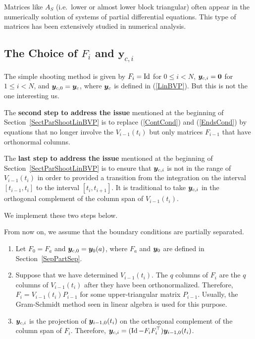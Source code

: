 \begin{rmkList}
\begin{enumerate}
Matrices like $A_S$ (i.e.\ lower or almost lower block triangular) often
appear in the numerically solution of systems of partial differential
equations.  This type of matrices has been extensively studied in
numerical analysis.  \label{ParShootPartSepRmkItem3}
\end{enumerate}
\end{rmkList}

\subsection{The Choice of $F_i$ and $\mathbf{y}_{c,i}$}\label{Fiyci}

The simple shooting method is given by $F_i = \operatorname{Id}$ for $0 \leq i < N$,
$\bm{y}_{c,i} = \bm{0}$ for $1 \leq i < N$, and
$\bm{y}_{c,0} = \bm{y}_c$, where $\bm{y}_c$ is defined in
(\ref{LinBVP}).  But this is not the one interesting us.

The {\bfseries second step to address the issue} mentioned at the
beginning of Section~\ref{SectParShootLinBVP} is to replace
(\ref{ContCond}) and (\ref{EndsCond}) by equations that no longer
involve the $V_{i-1}(t_i)$ but only matrices $F_{i-1}$ that have
orthonormal columns.

The {\bfseries last step to address the issue} mentioned at the
beginning of Section~\ref{SectParShootLinBVP} is to ensure that
$\bm{y}_{c,i}$ is not in the range of $V_{i-1}(t_i)$ in order to
provided a transition from the integration on the interval
$[t_{i-1},t_i]$ to the interval $[t_i,t_{i+1}]$.  It is traditional to
take $\bm{y}_{c,i}$ in the orthogonal complement of the column span
of $V_{i-1}(t_i)$.

We implement these two steps below.

From now on, we assume that the boundary conditions are partially
separated.

\begin{enumerate}
\item Let $F_0 = F_a$ and $\bm{y}_{c,0} = \bm{y}_0(a)$, where
$F_a$ and $\bm{y}_0$ are defined in Section~\ref{SepPartSep}.
\item Suppose that we have determined $V_{i-1}(t_i)$.  The $q$ columns
of $F_i$ are the $q$ columns of $V_{i-1}(t_i)$ after they have
been orthonormalized.  Therefore, $F_i = V_{i-1}(t_i) P_{i-1}$ for
some  upper-triangular matrix $P_{i-1}$.  Usually, the
Gram-Schmidt method seen in linear algebra is used for this purpose.
\item $\bm{y}_{c,i}$ is the projection of $\bm{y}_{i-1,0}(t_i)$ on
the orthogonal complement of the column span of $F_i$.  Therefore,
$\displaystyle \bm{y}_{c,i} = (\operatorname{Id} - F_iF_i^\top) \bm{y}_{i-1,0}(t_i)$.
\end{enumerate}

